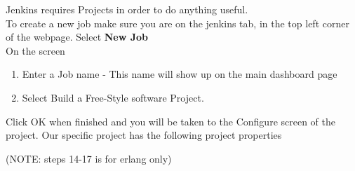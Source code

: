 Jenkins requires Projects in order to do anything useful. \\

To create a new job make sure you are on the jenkins tab, in the top left corner of the webpage. 
Select \textbf{New Job}\\

On the screen 
\begin{enumerate}
\item Enter a Job name - This name will show up on the main dashboard page
\item Select Build a Free-Style software Project.
\end{enumerate}
Click OK when finished and you will be taken to the Configure screen of the project.
Our specific project has the following project properties

(NOTE: steps 14-17 is for erlang only)

